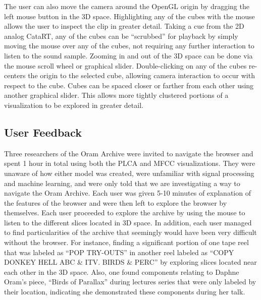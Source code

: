\documentclass[a4paper,10pt,final]{ThesisStyle}
\begin{document}
The user can also move the camera around the OpenGL origin by dragging the left mouse button in the 3D space.   Highlighting any of the cubes with the mouse allows the user to inspect the clip in greater detail.  Taking a cue from the 2D analog CataRT, any of the cubes can be ``scrubbed'' for playback by simply moving the mouse over any of the cubes, not requiring any further interaction to listen to the sound sample.  Zooming in and out of the 3D space can be done via the mouse scroll wheel or graphical slider.  Double-clicking on any of the cubes re-centers the origin to the selected cube, allowing camera interaction to occur with respect to the cube.  Cubes can be spaced closer or farther from each other using another graphical slider.  This allows more tightly clustered portions of a visualization to be explored in greater detail.  



\subsection{User Feedback}\label{results}

Three researchers of the Oram Archive were invited to navigate the browser and spent 1 hour in total using both the PLCA and MFCC visualizations.  They were unaware of how either model was created, were unfamiliar with signal processing and machine learning, and were only told that we are investigating a way to navigate the Oram Archive.  Each user was given 5-10 minutes of explanation of the features of the browser and were then left to explore the browser by themselves.  Each user proceeded to explore the archive by using the mouse to listen to the different slices located in 3D space.  In addition, each user managed to find particularities of the archive that seemingly would have been very difficult without the browser.  For instance, finding a significant portion of one tape reel that was labeled as ``POP TRY-OUTS'' in another reel labeled as ``COPY DONKEY HELL ABC \& ITV. BIRDS \& PERC'' by exploring slices located near each other in the 3D space.  Also, one found components relating to Daphne Oram's piece, ``Birds of Parallax'' during lectures series that were only labeled by their location, indicating she demonstrated these components during her talk.
\end{document}
